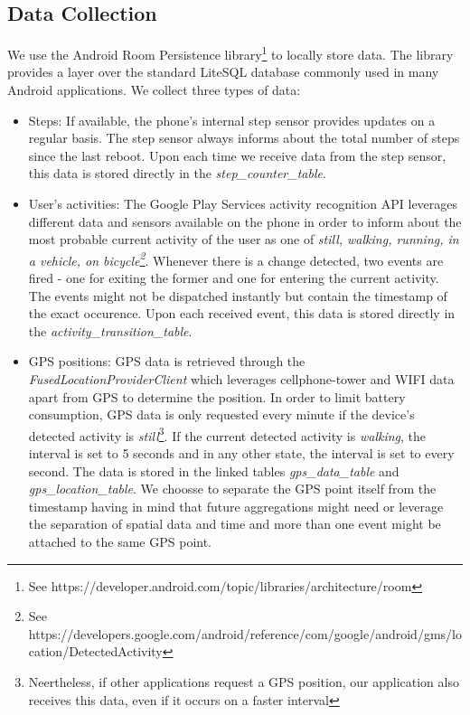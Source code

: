 \subsection {Data Collection}
We use the Android Room Persistence library\footnote{See https://developer.android.com/topic/libraries/architecture/room} to locally store data. The library provides a layer over the standard LiteSQL database commonly used in many Android applications. We collect three types of data:
\begin{itemize}
	\item Steps: If available, the phone's internal step sensor provides updates on a regular basis. The step sensor always informs about the total number of steps since the last reboot. Upon each time we receive data from the step sensor, this data is stored directly in the \textit{step\_counter\_table}.
	\item User's activities: The Google Play Services  activity recognition API leverages different data and sensors available on the phone in order to inform about the most probable current activity of the user as one of \textit{still, walking, running, in a vehicle, on bicycle\footnote{See https://developers.google.com/android/reference/com/google/android/gms/location/DetectedActivity}}. Whenever there is a change detected, two events are fired - one for exiting the former and one for entering the current activity. The events might not be dispatched instantly but contain the timestamp of the exact occurence. Upon each received event, this data is stored directly in the \textit{activity\_transition\_table}.
	\item GPS positions: GPS data is retrieved through the \textit{FusedLocationProviderClient} which leverages cellphone-tower and WIFI data apart from GPS to determine the position. In order to limit battery consumption, GPS data is only requested every minute if the device's detected activity is \textit{still}\footnote{Neertheless, if other applications request a GPS position, our application also receives this data, even if it occurs on a faster interval}. If the current detected activity is \textit{walking}, the interval is set to 5 seconds and in any other state, the interval is set to every second. The data is stored in the linked tables \textit{gps\_data\_table} and \textit{gps\_location\_table}. We choosse to separate the GPS point itself from the timestamp having in mind that future aggregations might need or leverage the separation of spatial data and time and more than one event might be attached to the same GPS point.
\end{itemize}

